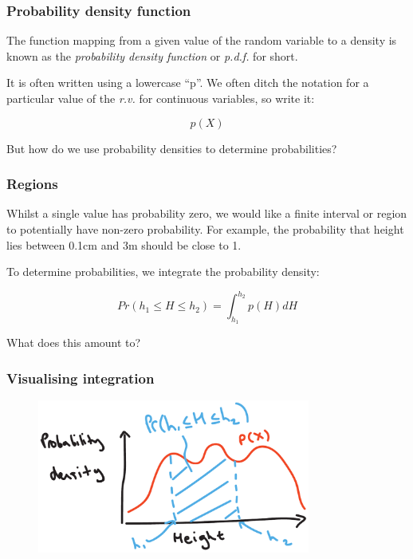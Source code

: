 \documentclass{beamer}
\begin{document}
	\begin{frame}
		\frametitle{Probability density function}
		
		The function mapping from a given value of the random variable to a density is known as the \textit{probability density function} or \textit{p.d.f.} for short.
		
		\vspace{0.5cm}
		
		It is often written using a lowercase ``p''. We often ditch the notation for a particular value of the \textit{r.v.} for continuous variables, so write it:
		
		\begin{equation}
		p(X)
		\end{equation}
		
		But how do we use probability densities to determine probabilities?
		
	\end{frame}
	
	\begin{frame}
		\frametitle{Regions}
		
		Whilst a single value has probability zero, we would like a finite interval or region to potentially have non-zero probability. For example, the probability that height lies between 0.1cm and 3m should be close to 1.
		
		\vspace{0.5cm}
		
		To determine probabilities, we integrate the probability density:
		
		\begin{equation}
		Pr(h_1 \leq H \leq h_2) = \int_{h_1}^{h_2} p(H) dH
		\end{equation}
		
		What does this amount to?
		
	\end{frame}
	
	\begin{frame}
		\frametitle{Visualising integration}
		
		\begin{figure}[ht]
			\centerline{\includegraphics[width=0.8\textwidth]{./figures/height_density_area.pdf}}
		\end{figure}
		
	\end{frame}
	
\end{document}
